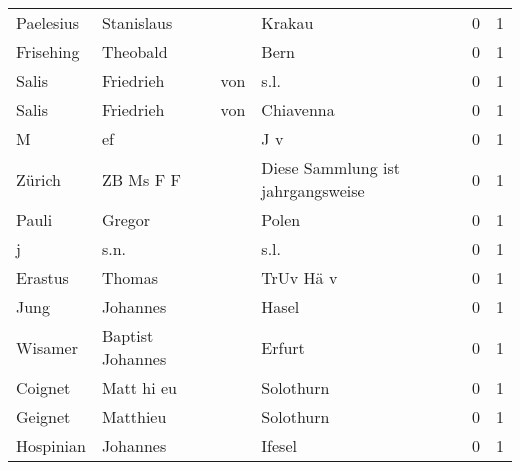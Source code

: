 \begin{tabular}{llllrr}
                Paelesius &                         Stanislaus &             &                                      Krakau &          0 &         1 \\
                Frisehing &                           Theobald &             &                                        Bern &          0 &         1 \\
                    Salis &                          Friedrieh &         von &                                        s.l. &          0 &         1 \\
                    Salis &                          Friedrieh &         von &                                   Chiavenna &          0 &         1 \\
                        M &                                 ef &             &                                         J v &          0 &         1 \\
                   Zürich &                          ZB Ms F F &             &           Diese Sammlung ist jahrgangsweise &          0 &         1 \\
                    Pauli &                             Gregor &             &                                       Polen &          0 &         1 \\
                        j &                               s.n. &             &                                        s.l. &          0 &         1 \\
                  Erastus &                             Thomas &             &                                   TrUv Hä v &          0 &         1 \\
                     Jung &                           Johannes &             &                                       Hasel &          0 &         1 \\
                  Wisamer &                   Baptist Johannes &             &                                      Erfurt &          0 &         1 \\
                  Coignet &                         Matt hi eu &             &                                   Solothurn &          0 &         1 \\
                  Geignet &                           Matthieu &             &                                   Solothurn &          0 &         1 \\
                Hospinian &                           Johannes &             &                                      Ifesel &          0 &         1 \\

\end{tabular}
